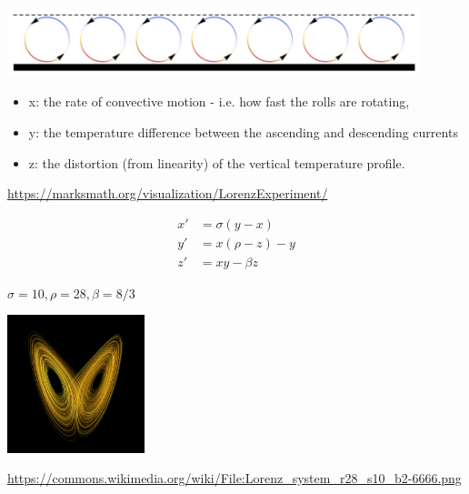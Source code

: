 \documentclass[aspectratio=169]{beamer}
\begin{document}
\begin{frame}

\begin{center}
\includegraphics[width = 0.9\textwidth]{figures/lorenz_rolls}
\end{center}

\begin{itemize}
\item x: the rate of convective motion - i.e. how fast the rolls are rotating,
\item y: the temperature difference between the ascending and descending currents
\item z: the distortion (from linearity) of the vertical temperature profile.
\end{itemize}

\vfill
\tiny{\url{https://marksmath.org/visualization/LorenzExperiment/}}

\end{frame}
\begin{frame}

\begin{align*}
  x' &= \sigma(y-x) \\
  y' &= x(\rho-z)-y \\
  z' &= xy-\beta z
\end{align*}
\begin{center}
$\sigma = 10, \rho = 28,  \beta = 8/3$ 
\end{center}

\begin{center}
\includegraphics[width = 0.3\textwidth]{figures/Lorenz_system_r28_s10_b2-6666}
\end{center}

\vfill
\tiny{\url{https://commons.wikimedia.org/wiki/File:Lorenz_system_r28_s10_b2-6666.png}}
\end{frame}
\end{document}
